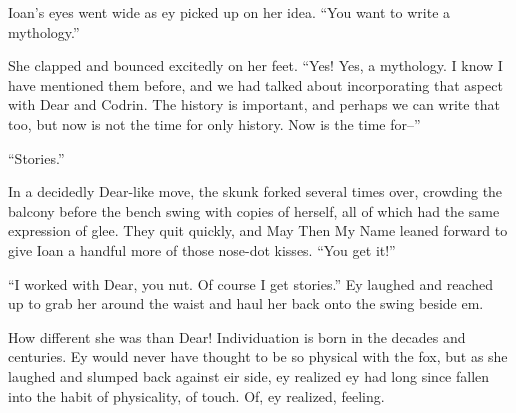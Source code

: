 Ioan's eyes went wide as ey picked up on her idea. ``You want to write a mythology.''

She clapped and bounced excitedly on her feet. ``Yes! Yes, a mythology. I know I have mentioned them before, and we had talked about incorporating that aspect with Dear and Codrin. The history is important, and perhaps we can write that too, but now is not the time for only history. Now is the time for--''

``Stories.''

In a decidedly Dear-like move, the skunk forked several times over, crowding the balcony before the bench swing with copies of herself, all of which had the same expression of glee. They quit quickly, and May Then My Name leaned forward to give Ioan a handful more of those nose-dot kisses. ``You get it!''

``I worked with Dear, you nut. Of course I get stories.'' Ey laughed and reached up to grab her around the waist and haul her back onto the swing beside em.

How different she was than Dear! Individuation is born in the decades and centuries. Ey would never have thought to be so physical with the fox, but as she laughed and slumped back against eir side, ey realized ey had long since fallen into the habit of physicality, of touch. Of, ey realized, feeling.

